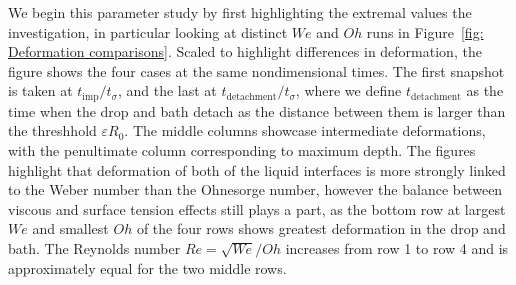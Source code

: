 We begin this parameter study by first highlighting the extremal values the investigation, in particular looking at distinct $W\!e$ and $Oh$ runs in Figure~\ref{fig: Deformation comparisons}. Scaled to highlight differences in deformation, the figure shows the four cases at the same nondimensional times. The first snapshot is taken at $t_\text{imp}/t_\sigma$, and the last at $t_\text{detachment}/t_\sigma$, where we define $t_\text{detachment}$ as the time when the drop and bath detach as the distance between them is larger than the threshhold $\varepsilon R_0$. The middle columns showcase intermediate deformations, with the penultimate column corresponding to maximum depth. The figures highlight that deformation of both of the liquid interfaces is more strongly linked to the Weber number than the Ohnesorge number, however the balance between viscous and surface tension effects still plays a part, as the bottom row at largest $W\!e$ and smallest $Oh$ of the four rows shows greatest deformation in the drop and bath. The Reynolds number $Re=\sqrt{W\!e}/Oh$ increases from row 1 to row 4 and is approximately equal for the two middle rows. 

